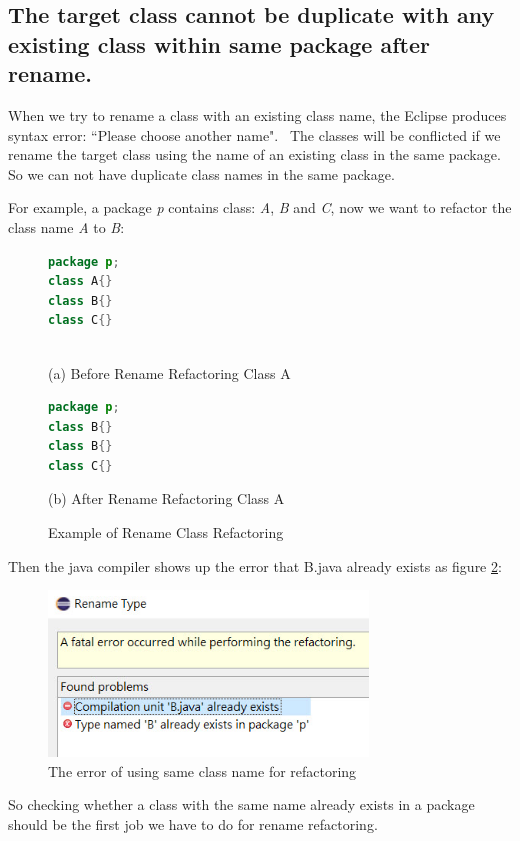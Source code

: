 \subsection{The target class cannot be duplicate with any existing class within same package after rename.}

When we try to rename a class with an existing class name, the Eclipse produces syntax error:
``Please choose another name".~\cite{EclipseWebPage} The classes will be conflicted if we rename the target class using the name of an existing class in the same package. So we can not have duplicate class names in the same package. 

For example, a package \textsl{p} contains class: \textsl{A}, \textsl{B} and \textsl{C}, now we want to refactor the class name \textsl{A} to \textsl{B}:

\begin{figure}[th]
\centering
\begin{minipage}[t]{0.6\linewidth}
\begin{lstlisting}[language=java, basicstyle=\scriptsize\ttfamily,frame=single]
package p;
class A{}	
class B{}
class C{}
 
\end{lstlisting}
\tiny{(a) Before Rename Refactoring Class A}
\end{minipage}
\hfill


\begin{minipage}[t]{0.6\linewidth}
\begin{lstlisting}[language=java, basicstyle=\scriptsize\ttfamily,frame=single]
package p;
class B{}	
class B{}
class C{}

\end{lstlisting}
\tiny{(b) After Rename Refactoring Class A}
\end{minipage}
\caption{Example of Rename Class Refactoring}
\label{fig:afterrr}
\end{figure}

Then the java compiler shows up the error that B.java already exists as figure \ref{fig:renameclassname}:

\begin{figure}[H]
\centerline{\includegraphics[width=85mm,scale=0.5]{SCN.jpg}}
\caption{The error of using same class name for refactoring}
\label{fig:renameclassname}
\end{figure}

So checking whether a class with the same name already exists in a package should be the first job we have to do for rename refactoring.   